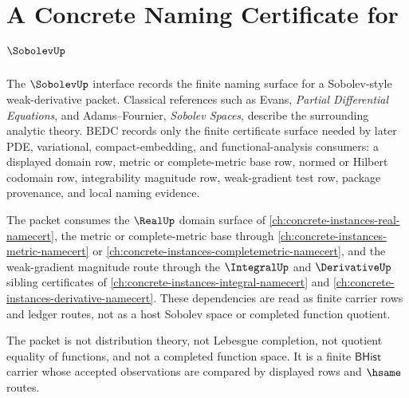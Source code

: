 \chapter{A Concrete Naming Certificate for $\SobolevUp$}
\label{ch:concrete-instances-sobolev-namecert}

The $\SobolevUp$ interface records the finite naming surface for a Sobolev-style weak-derivative packet. Classical references such as Evans, \emph{Partial Differential Equations}, and Adams--Fournier, \emph{Sobolev Spaces}, describe the surrounding analytic theory. BEDC records only the finite certificate surface needed by later PDE, variational, compact-embedding, and functional-analysis consumers: a displayed domain row, metric or complete-metric base row, normed or Hilbert codomain row, integrability magnitude row, weak-gradient test row, package provenance, and local naming evidence.

The packet consumes the $\RealUp$ domain surface of \autoref{ch:concrete-instances-real-namecert}, the metric or complete-metric base through \autoref{ch:concrete-instances-metric-namecert} or \autoref{ch:concrete-instances-completemetric-namecert}, and the weak-gradient magnitude route through the $\IntegralUp$ and $\DerivativeUp$ sibling certificates of \autoref{ch:concrete-instances-integral-namecert} and \autoref{ch:concrete-instances-derivative-namecert}. These dependencies are read as finite carrier rows and ledger routes, not as a host Sobolev space or completed function quotient.

The packet is not distribution theory, not Lebesgue completion, not quotient equality of functions, and not a completed function space. It is a finite $\mathsf{BHist}$ carrier whose accepted observations are compared by displayed rows and $\hsame$ routes.

